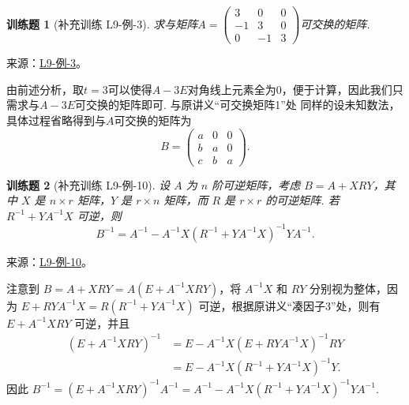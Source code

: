 \documentclass[12pt,fontset=fandol]{ctexart}
\newtheorem{exercise}{训练题}[section]
\begin{document}
\begin{exercise}[补充训练 L9-例-3]\label{prob:L9-例-3}
求与矩阵$A=\begin{pmatrix}
            3  & 0  & 0 \\
            -1 & 3  & 0 \\
            0  & -1 & 3
        \end{pmatrix}$可交换的矩阵.
\end{exercise}
\noindent 来源：\href{https://github.com/yhwu-is/Linear-Algebra-Left-Undone/blob/new/%E8%AE%B2%E4%B9%89/%E4%B8%93%E9%A2%98/9%20%E7%9F%A9%E9%98%B5%E8%BF%90%E7%AE%97%E8%BF%9B%E9%98%B6.tex}{L9-例-3}。
\begin{solve}
由前述分析，取$t=3$可以使得$A-3E$对角线上元素全为0，便于计算，因此我们只需求与$A-3E$可交换的矩阵即可. 与原讲义“可交换矩阵1”处 同样的设未知数法，具体过程省略得到与$A$可交换的矩阵为
    \[B=\begin{pmatrix}
            a & 0 & 0 \\
            b & a & 0 \\
            c & b & a
        \end{pmatrix}.\]
\end{solve}

\begin{exercise}[补充训练 L9-例-10]\label{prob:L9-例-10}
设 $A$ 为 $n$ 阶可逆矩阵，考虑 $B = A + XRY$，其中 $X$ 是 $n \times r$ 矩阵，$Y$ 是 $r \times n$ 矩阵，而 $R$ 是 $r \times r$ 的可逆矩阵. 若 $R^{-1} + YA^{-1}X$ 可逆，则
    \[B^{-1}=A^{-1}-A^{-1}X(R^{-1}+YA^{-1}X)^{-1}YA^{-1}.\]
\end{exercise}
\noindent 来源：\href{https://github.com/yhwu-is/Linear-Algebra-Left-Undone/blob/new/%E8%AE%B2%E4%B9%89/%E4%B8%93%E9%A2%98/9%20%E7%9F%A9%E9%98%B5%E8%BF%90%E7%AE%97%E8%BF%9B%E9%98%B6.tex}{L9-例-10}。
\begin{solve}
注意到 $B = A + XRY = A(E + A^{-1}XRY)$，将 $A^{-1}X$ 和 $RY$ 分别视为整体，因为 $E + RYA^{-1}X = R(R^{-1} + YA^{-1}X)$ 可逆，根据原讲义“凑因子3”处，则有 $E + A^{-1}XRY$ 可逆，并且
    \begin{align*}
        (E + A^{-1}XRY)^{-1} & = E - A^{-1}X(E + RYA^{-1}X)^{-1}RY \\
                             & = E - A^{-1}X(R^{-1} + YA^{-1}X)^{-1}Y.
    \end{align*}
    因此 $B^{-1} = (E + A^{-1}XRY)^{-1}A^{-1} = A^{-1} - A^{-1}X(R^{-1} + YA^{-1}X)^{-1}YA^{-1}$.
\end{solve}
\end{document}
